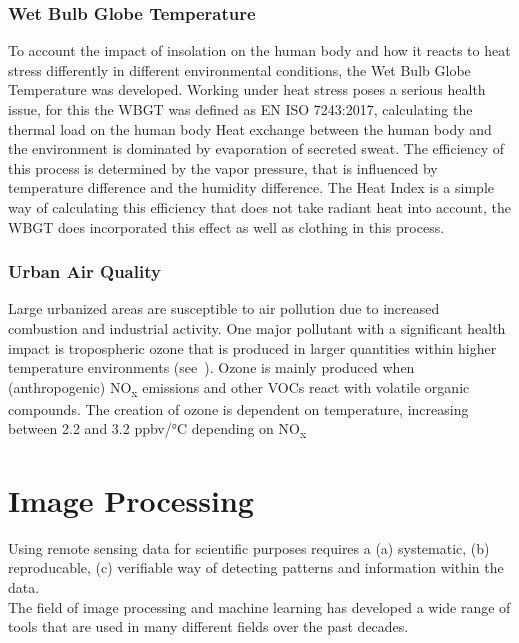 \documentclass[a4paper, english]{article}
\begin{document}
    \subsubsection{Wet Bulb Globe Temperature}
    To account the impact of insolation on the human body and how it reacts to heat stress differently in different environmental conditions, the Wet Bulb Globe Temperature was developed. 
    Working under heat stress poses a serious health issue, for this the \gls{WBGT} was defined as EN ISO 7243:2017, calculating the thermal load on the human body\cite{14001700}
    Heat exchange between the human body and the environment is dominated by evaporation of secreted sweat.
    The efficiency of this process is determined by the vapor pressure, that is influenced by temperature difference and the humidity difference. %
    The Heat Index is a simple way of calculating this efficiency that does not take radiant heat into account, the WBGT does incorporated this effect as well as clothing in this process. 


    \subsubsection{Urban Air Quality}
    Large urbanized areas are susceptible to air pollution due to increased combustion and industrial activity. %
    One major pollutant with a significant health impact is tropospheric ozone that is produced in larger quantities within higher temperature environments (see~\cite{Ebi2008}). 
    Ozone is mainly produced when (anthropogenic) NO\textsubscript{x} emissions and other \glspl{VOC} react with volatile organic compounds. %
    The creation of ozone is dependent on temperature, increasing between 2.2 and 3.2 ppbv/°C depending on NO\textsubscript{x}

    \section{Image Processing}\label{sec:imgProcessing}
    Using remote sensing data for scientific purposes requires a (a) systematic, (b) reproducable, (c) verifiable way of detecting patterns and information within the data. \\ 
    The field of image processing and machine learning has developed a wide range of tools that are used in many different fields over the past decades. %
\end{document}
